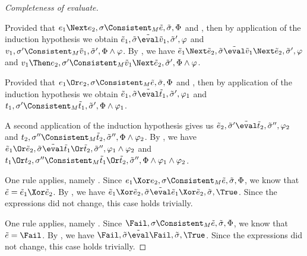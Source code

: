 \begin{proof}[Completeness of evaluate]
{    }

    {
    Provided that $e_1\Next e_2,\sigma\Consistent_M \tilde{e},\tilde{\sigma},\Phi$ and ,
    then by application of the induction hypothesis we obtain $\tilde{e}_1,\tilde{\sigma}\tilde{\eval}\tilde{v}_1,\tilde{\sigma}',\phi$
    and $v_1,\sigma'\Consistent_M \tilde{v}_1,\tilde{\sigma}',\Phi\land\phi$.
    By , we have $\tilde{e}_1\Next \tilde{e}_2,\tilde{\sigma}\tilde{\eval}\tilde{v}_1\Next\tilde{e}_2,\tilde{\sigma}',\phi$ and $v_1\Then e_2 ,\sigma'\Consistent_M \tilde{v}_1\Next\tilde{e}_2 ,\tilde{\sigma}',\Phi\land\phi$.

    }

    {
    Provided that $e_1\Or e_2,\sigma\Consistent_M \tilde{e},\tilde{\sigma},\Phi$ and ,
    then by application of the induction hypothesis we obtain $\tilde{e}_1,\tilde{\sigma}\tilde{\eval}\tilde{t}_1,\tilde{\sigma}',\phi_1$
    and $t_1,\sigma'\Consistent_M \tilde{t}_1,\tilde{\sigma}',\Phi\land\phi_1$.

    A second application of the induction hypothesis gives us  $\tilde{e}_2,\tilde{\sigma}'\tilde{\eval}\tilde{t}_2,\tilde{\sigma}'',\phi_2$
    and $t_2,\sigma''\Consistent_M \tilde{t}_2,\tilde{\sigma}'',\Phi\land\phi_2$.
    By , we have $\tilde{e}_1\Or \tilde{e}_2,\tilde{\sigma}\tilde{\eval}\tilde{t}_1\Or\tilde{t}_2,\tilde{\sigma}'',\phi_1\land\phi_2$ and $t_1\Or t_2 ,\sigma''\Consistent_M \tilde{t}_1\Or\tilde{t}_2 ,\tilde{\sigma}'',\Phi\land\phi_1\land\phi_2$.
    }

    {  One rule applies, namely .
    Since $e_1\Xor e_2,\sigma\Consistent_M \tilde{e},\tilde{\sigma},\Phi$, we know that $\tilde{e}=\tilde{e}_1\Xor \tilde{e}_2$.
    By , we have $\tilde{e}_1\Xor \tilde{e}_2,\tilde{\sigma}\tilde{\eval}\tilde{e}_1\Xor \tilde{e}_2,\tilde{\sigma},\True$.
    Since the expressions did not change, this case holds trivially.

    }

    {  One rule applies, namely .
    Since $\Fail,\sigma\Consistent_M \tilde{e},\tilde{\sigma},\Phi$, we know that $\tilde{e}=\Fail$.
    By , we have $\Fail,\tilde{\sigma}\tilde{\eval}\Fail,\tilde{\sigma},\True$.
    Since the expressions did not change, this case holds trivially.


    }
\end{proof}
